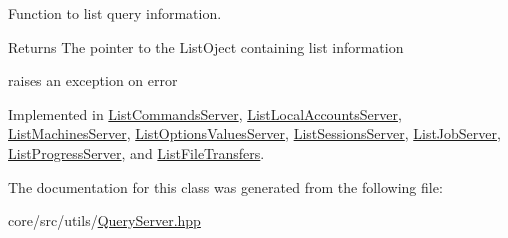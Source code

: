 Function to list query information. 

\begin{DoxyReturn}{Returns}
The pointer to the ListOject containing list information 

raises an exception on error 
\end{DoxyReturn}


Implemented in \hyperlink{classListCommandsServer_ae256dad4b7cb57e73dd3dc2c5dcb3e7b}{ListCommandsServer}, \hyperlink{classListLocalAccountsServer_aab1471d2b577b25471f12652b6e78b31}{ListLocalAccountsServer}, \hyperlink{classListMachinesServer_abbaceb388d6ad47bc9e82a3f33e978a3}{ListMachinesServer}, \hyperlink{classListOptionsValuesServer_a193d667fd5fa247300cebd4af85785d6}{ListOptionsValuesServer}, \hyperlink{classListSessionsServer_a2ce41ba3a29999d9ef1799c990d29b29}{ListSessionsServer}, \hyperlink{classListJobServer_a88da8c8e36fce6142758dc5779e0adae}{ListJobServer}, \hyperlink{classListProgressServer_a638132aca020d8168e5185df47e881f0}{ListProgressServer}, and \hyperlink{classListFileTransfers_a51a0f5e3382378220277271122a619d7}{ListFileTransfers}.



The documentation for this class was generated from the following file:\begin{DoxyCompactItemize}
\item 
core/src/utils/\hyperlink{QueryServer_8hpp}{QueryServer.hpp}\end{DoxyCompactItemize}
